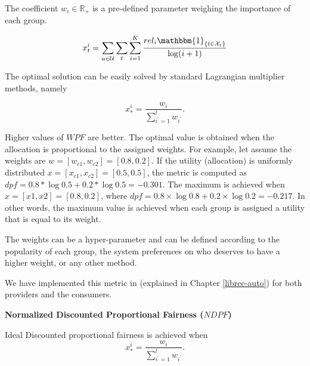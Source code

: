         The coefficient $w_i\in\mathbb R_+$ is a pre-defined parameter weighing the importance of each group.
        
        
        \begin{equation*}
        x_{t}^i=\sum_{u\in\mathcal U}\sum_{t}\sum_{i=1}^K\frac{{rel}_i\mathbbm{1}_{\{t\in \mathcal X_{t}\}}}{\log(i+1)}
        \end{equation*}
        
        
        The optimal solution can be easily solved by standard Lagrangian multiplier methods, namely
        
        \begin{equation}
        x_*^i=\frac{w_i}{\sum_{i^{'}=1}^lw_{i^{'}}}.
        \end{equation}
        
        Higher values of $WPF$ are better. The optimal value is obtained when the allocation is proportional to the assigned weights. For example, let assume the weights are $w = [w_{c1}, w_{c2}] = [0.8, 0.2]$. If the utility (allocation) is uniformly distributed $x = [x_{c1}, x_{c2}] = [0.5,0.5]$, the metric is computed as $dpf = 0.8*\log 0.5+0.2*\log 0.5=-0.301$. The maximum is achieved when $x = [x1, x2] = [0.8, 0.2]$, where $dpf=0.8\times \log 0.8 + 0.2\times \log 0.2 = -0.217 $. In other words, the maximum value is achieved when each group is assigned a utility that is equal to its weight.
        
        The weights can be a hyper-parameter and can be defined according to the popularity of each group, the system preferences on who deserves to have a higher weight, or any other method.
        
        We have implemented this metric in \libauto{} (explained in Chapter \ref{librec-auto}) for both providers and the consumers.
        
        
        
        
        \textbf{Normalized Discounted Proportional Fairness ($NDPF$)}

        Ideal Discounted proportional fairness is achieved when
        \begin{equation}
        x_*^i=\frac{w_i}{\sum_{i^{'}=1}^lw_{i^{'}}}.
        \end{equation}
        
